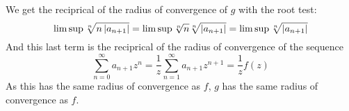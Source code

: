 \documentclass{homework}
\begin{document}
                                                                                                                                    \begin{solution}
                                                                                                                                    We get the reciprical of the radius of convergence of $g$ with the root test:
                                                                                                                                    \[
                                                                                                                                    \limsup \sqrt[n]{n\left|a_{n+1}\right|} =
                                                                                                                                    \limsup \sqrt[n]{n}\sqrt[n]{\left|a_{n+1}\right|} =
                                                                                                                                    \limsup \sqrt[n]{\left|a_{n+1}\right|}
                                                                                                                                    \]
                                                                                                                                    And this last term is the reciprical of the radius of convergence of the sequence 
                                                                                                                                    \[
                                                                                                                                    \sum_{n=0}^\infty a_{n+1}z^n = \frac{1}{z}\sum_{n=1}^\infty a_{n+1}z^{n+1} = \frac{1}{z}f(z)
                                                                                                                                    \]
                                                                                                                                    As this has the same radius of convergence as $f$,
                                                                                                                                    $g$ has the same radius of convergence as $f$.


\end{solution}
\end{document}
